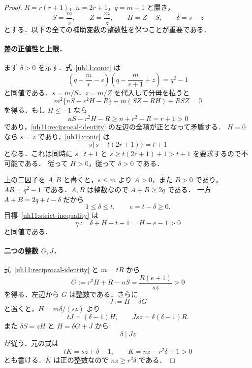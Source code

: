 \begin{proof}
$R=r(r+1)$，$n=2r+1$，$q=m+1$ と置き，
\[
 S=\frac ms,\qquad Z=\frac mz,\qquad H=Z-S,\qquad \delta=s-z
\]
とする．以下の全ての補助変数の整数性を保つことが重要である．

\paragraph{差の正値性と上限．}
まず $\delta>0$ を示す．式~\eqref{uh11:conic} は
\[
 \left(q+\frac mr-s\right)
 \left(q-\frac{m}{r+1}+z\right)=q^2-1
\]
と同値である．$s=m/S$，$z=m/Z$ を代入して分母を払うと
\begin{equation}\label{uh11:reciprocal-identity}
 m^2\{nS-r^2H-R\}+m(SZ-RH)+RSZ=0
\end{equation}
を得る．もし $H\leq-1$ なら
\[
 nS-r^2H-R\geq n+r^2-R=r+1>0
\]
であり，\eqref{uh11:reciprocal-identity} の左辺の全項が正となって矛盾する．
$H=0$ なら $s=z$ であり，\eqref{uh11:conic} は
\[
 s\{s-t(2r+1)\}=t+1
\]
となる．これは同時に $s\mid t+1$ と $s\geq t(2r+1)+1>t+1$ を要求するので不可能である．
従って $H>0$，従って $\delta>0$ である．

上の二因子を $A,B$ と書くと，$s\leq m$ より $A>0$，また $B>0$ であり，
$AB=q^2-1$ である．$A,B$ は整数なので $A+B\geq2q$ である．
一方 $A+B=2q+t-\delta$ だから
\begin{equation}\label{uh11:delta-range}
 1\leq\delta\leq t,\qquad e=t-\delta\geq0.
\end{equation}
目標~\eqref{uh11:strict-inequality} は
\begin{equation}\label{uh11:eta}
 \eta:=\delta+H-t-1=H-e-1>0
\end{equation}
と同値である．

\paragraph{二つの整数 $G,J$．}
式~\eqref{uh11:reciprocal-identity} と $m=tR$ から
\begin{equation}\label{uh11:G}
 G:=r^2H+R-nS=\frac{R(e+1)}{sz}>0
\end{equation}
を得る．左辺から $G$ は整数である．さらに
\[
 J:=H-\delta G
\]
と置くと，$H=m\delta/(sz)$ より
\begin{equation}\label{uh11:J-identities}
 tJ=(\delta-1)H,\qquad Jsz=\delta(\delta-1)R.
\end{equation}
また $\delta S=zH$ と $H=\delta G+J$ から
\begin{equation}\label{uh11:J-divisibility}
 \delta\mid Jz
\end{equation}
が従う．元の式は
\begin{equation}\label{uh11:K}
 tK=sz+\delta-1,
 \qquad K=nz-r^2\delta+1>0
\end{equation}
とも書ける．$K$ は正の整数なので $nz\geq r^2\delta$ である．


\end{proof}
